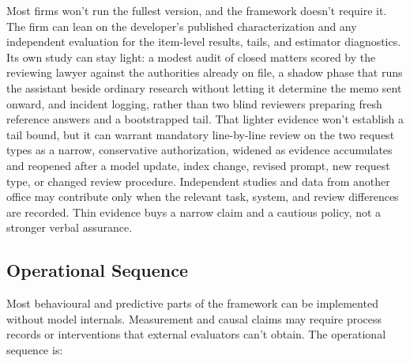 \documentclass[12pt]{article}
\begin{document}
Most firms won't run the fullest version, and the framework doesn't require it. The firm can lean on the developer's published characterization and any independent evaluation for the item-level results, tails, and estimator diagnostics. Its own study can stay light: a modest audit of closed matters scored by the reviewing lawyer against the authorities already on file, a shadow phase that runs the assistant beside ordinary research without letting it determine the memo sent onward, and incident logging, rather than two blind reviewers preparing fresh reference answers and a bootstrapped tail. That lighter evidence won't establish a tail bound, but it can warrant mandatory line-by-line review on the two request types as a narrow, conservative authorization, widened as evidence accumulates and reopened after a model update, index change, revised prompt, new request type, or changed review procedure. Independent studies and data from another office may contribute only when the relevant task, system, and review differences are recorded. Thin evidence buys a narrow claim and a cautious policy, not a stronger verbal assurance.

\subsection{Operational Sequence}\label{ssec:workflow_sequence}

Most behavioural and predictive parts of the framework can be implemented without model internals. Measurement and causal claims may require process records or interventions that external evaluators can't obtain. The operational sequence is:
\end{document}
